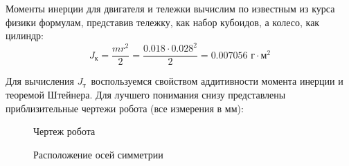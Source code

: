 \documentclass[a4paper]{article}
\begin{document}
\begin{flushleft}
Моменты инерции для двигателя и тележки вычислим по известным из курса физики формулам, представив тележку, как набор кубоидов, а колесо, как цилиндр:
\begin{equation*}
    J_{\text{к}} = \frac{mr^2}{2} = \frac{0.018 \cdot 0.028^2}{2} = 0.007056 \text{ г} \cdot \text{м}^2
\end{equation*}

Для вычисления \(J_{\text{т}}\)\ воспользуемся свойством аддитивности момента инерции и теоремой Штейнера. Для лучшего понимания снизу представлены приблизительные чертежи робота (все измерения в мм):

\begin{figure} [!ht]
    \caption{Чертеж робота}
\end{figure}

\begin{figure} [!ht]
    \caption{Расположение осей симметрии}
\end{figure}


\end{flushleft}
\end{document}
